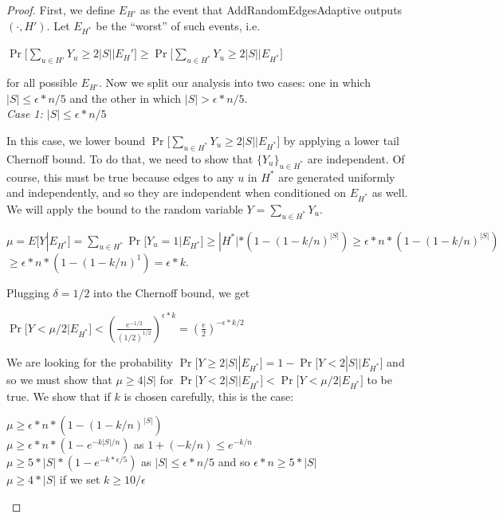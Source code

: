 \documentclass{article}
\begin{document}
\begin{proof}
First, we define $E_{H'}$ as the event that AddRandomEdgesAdaptive outputs $(\cdot, H')$. Let $E_{H^*}$ be the ``worst'' of such events, i.e.
\begin{center}
    $\Pr \big[\sum_{u \in H'} Y_u \geq 2|S| \big | E_H'\big ] \geq \Pr\big [\sum_{u \in H^*} Y_u \geq 2|S| \big | E_{H^*}\big ]$
\end{center}
for all possible $E_{H'}$. Now we split our analysis into two cases: one in which $|S| \leq \epsilon * n/5$ and the other in which $|S| > \epsilon * n/5$.\\
\textit{Case 1: $|S| \leq \epsilon * n/5$}

In this case, we lower bound $\Pr\big [\sum_{u \in H^*} Y_u \geq 2|S| \big | E_{H^*}\big ]$ by applying a lower tail Chernoff bound. To do that, we need to show that $\{Y_u\}_{u\in H^*}$ are independent. Of course, this must be true because edges to any $u$ in $H^*$ are generated uniformly and independently, and so they are independent when conditioned on $E_{H^*}$ as well. We will apply the bound to the random variable $Y = \sum_{u \in H^*}Y_u$.
\begin{center}
    $\mu = E[Y|E_{H^*}] = \sum_{u \in H^*} \Pr\big [Y_u = 1 \big | E_{H^*}\big ] \geq |H^*| * (1 - (1 - k/n)^{|S|}) \geq \epsilon * n * (1 - (1 - k/n)^{|S|})$\\
    $\geq \epsilon * n * (1 - (1 - k/n)^1) = \epsilon * k$. 
\end{center}
Plugging $\delta = 1/2$ into the Chernoff bound, we get
\begin{center}
    $\Pr\big [Y < \mu / 2 \big | E_{H^*}\big ] < (\frac{e^{-1/2}}{(1/2)^{1/2}}) ^{\epsilon * k} = (\frac{e}{2})^{-\epsilon*k/2}$
\end{center}

We are looking for the probability $\Pr[Y \geq 2|S| | E_{H^*}] = 1 - \Pr\big [Y < 2|S| \big | E_{H^*}\big ]$ and so we must show that $\mu \geq 4|S|$ for $\Pr\big [Y < 2|S| \big | E_{H^*}\big ] < \Pr\big [Y < \mu / 2 \big | E_{H^*}\big ]$ to be true. We show that if $k$ is chosen carefully, this is the case:

\begin{center}
    $\mu \geq \epsilon * n * (1 - (1 - k/n)^{|S|})$\\
    $\mu \geq \epsilon * n * (1 - e^{-k|S|/n})$ as $1 + (-k/n) \leq e^{-k/n}$\\
    $\mu \geq 5 * |S| * (1 - e^{-k*\epsilon / 5})$ as $|S| \leq \epsilon * n / 5$ and so $\epsilon * n \geq 5 * |S|$\\
    $\mu \geq 4 * |S|$ if we set $k \geq 10/\epsilon$
\end{center}


\end{proof}
\end{document}
